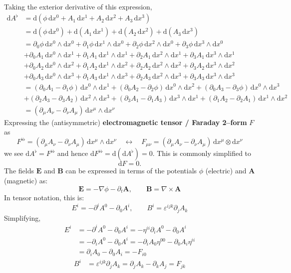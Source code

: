 \documentclass[12pt]{memoir}
\def\EE{\mathbf E}
\def\BB{\mathbf B}
\def\AA{\mathbf A}
\def\dd{\mathrm d}
\def\pd{\partial}
\def\eps{\varepsilon}
\newcommand\dx[1]{\dd x^{#1}}
\newcommand\ddx[2]{\dd x^{#1}\wedge\dd x^{#2}}
\begin{document}
Taking the exterior derivative of this expression,
\begin{align*}
\dd A^\flat
&= \dd\!\left(
\phi\,\dx{0}
+ A_1\,\dx{1}
+ A_2\,\dx{2}
+ A_3\,\dx{3}
\right)\\
&=
\dd\!\left(\phi\,\dx{0}\right)
+ \dd\!\left(A_1\,\dx{1}\right)
+ \dd\!\left(A_2\,\dx{2}\right)
+ \dd\!\left(A_3\,\dx{3}\right)\\[0.5em]
&=
\pd_0\phi\,\ddx{0}{0}
+ \pd_1\phi\,\ddx{1}{0}
+ \pd_2\phi\,\ddx{2}{0}
+ \pd_3\phi\,\ddx{3}{0}\\
&+\pd_0A_1\,\ddx{0}{1}
+ \pd_1A_1\,\ddx{1}{1}
+ \pd_2A_1\,\ddx{2}{1}
+ \pd_3A_1\,\ddx{3}{1}\\
&+\pd_0A_2\,\ddx{0}{2}
+ \pd_1A_2\,\ddx{1}{2}
+ \pd_2A_2\,\ddx{2}{2}
+ \pd_3A_2\,\ddx{3}{2}\\
&+\pd_0A_3\,\ddx{0}{3}
+ \pd_1A_3\,\ddx{1}{3}
+ \pd_2A_3\,\ddx{2}{3}
+ \pd_3A_3\,\ddx{3}{3}\\[0.5em]
&= \left(\pd_0A_1 - \pd_1\phi\right)\,\ddx{0}{1}
+ \left(\pd_0A_2 - \pd_2\phi\right)\,\ddx{0}{2}
+ \left(\pd_0A_3 - \pd_3\phi\right)\,\ddx{0}{3}\\
&+ \left(\pd_2A_3 - \pd_3A_2\right)\,\ddx{2}{3}
+ \left(\pd_3A_1 - \pd_1A_3\right)\,\ddx{3}{1}
+ \left(\pd_1A_2 - \pd_2A_1\right)\,\ddx{1}{2}\\[0.5em]
&= \left(\pd_\mu A_\nu - \pd_\nu A_\mu\right)\,\ddx{\mu}{\nu}
\end{align*}
Expressing the (antisymmetric)
\textbf{electromagnetic tensor / Faraday 2--form} $F$ as
\[F^{\flat\flat} = (\pd_\mu A_\nu - \pd_\nu A_\mu)\,\ddx{\mu}{\nu}
\quad\longleftrightarrow\quad
F_{\mu\nu} = (\pd_\mu A_\nu - \pd_\nu A_\mu)\,\dx{\mu}\otimes\dx{\nu}
\]
we see $\dd A^\flat = F^{\flat\flat}$ and hence $\dd F^{\flat\flat}
= \dd(\dd A^\flat) = 0$. This is commonly simplified to
\[\boxed{\dd F = 0.}\]
\vfill\pagebreak
\noindent
The fields $\EE$ and $\BB$ can be expressed in terms of the potentials
$\phi$ (electric) and $\AA$ (magnetic) as:
\[\EE = -\nabla\phi - \pd_t\AA,\qquad \BB = \nabla\times\AA\]
In tensor notation, this is:
\[E^i = -\pd^iA^0 - \pd_0A^i,\qquad B^i = \eps^{ijk}\pd_jA_k\]
Simplifying,
\begin{align*}
E^i &= -\pd^iA^0 - \pd_0A^i = -\eta^{ii}\pd_iA^0 - \pd_0A^i\\
&= -\pd_iA^0 - \pd_0A^i = -\pd_iA_0\eta^{00} - \pd_0A_i\eta^{ii}\\
&= \pd_iA_0 - \pd_0A_i = -F_{i0}
\end{align*}
\begin{align*}
B^i &= \eps^{ijk}\pd_jA_k = \pd_jA_k - \pd_kA_j = F_{jk}
\end{align*}
\end{document}
